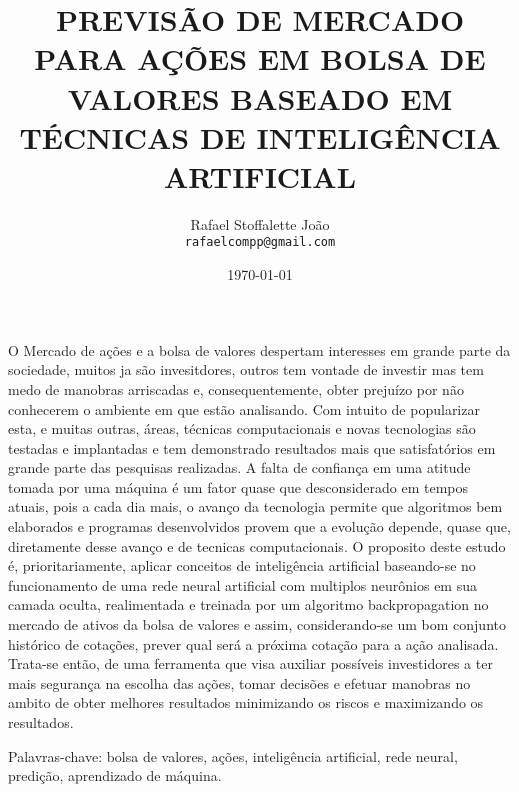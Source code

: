 \documentclass[brazil,twocolumn]{svjour3}
\author{Rafael Stoffalette João\\
\texttt{rafaelcompp@gmail.com}}
\title{ PREVISÃO DE MERCADO PARA AÇÕES EM BOLSA DE VALORES BASEADO EM TÉCNICAS DE INTELIGÊNCIA ARTIFICIAL
}
\date{\today}
\begin{document}
\maketitle

O Mercado de ações e a bolsa de valores despertam interesses em grande parte da sociedade, muitos ja são invesitdores, outros tem vontade de investir mas tem medo de manobras arriscadas e, consequentemente, obter prejuízo por não conhecerem o ambiente em que estão analisando. Com intuito de popularizar esta, e muitas outras, áreas, técnicas computacionais e novas tecnologias são testadas e implantadas e tem demonstrado resultados mais que satisfatórios em grande parte das pesquisas realizadas. 
A falta de confiança em uma atitude tomada por uma máquina é um fator quase que desconsiderado em tempos atuais, pois a cada dia mais, o avanço da tecnologia permite que algoritmos bem elaborados e programas desenvolvidos provem que a evolução depende, quase que, diretamente desse avanço  e de tecnicas computacionais.
O proposito deste estudo é, prioritariamente, aplicar conceitos de inteligência artificial baseando-se no funcionamento de uma rede neural artificial com multiplos neurônios em sua camada oculta, realimentada e treinada por um algoritmo backpropagation  no mercado de ativos da bolsa de valores e assim, considerando-se um bom conjunto histórico de cotações, prever qual será a próxima cotação para a ação analisada.
Trata-se então, de uma ferramenta que visa auxiliar possíveis investidores a ter mais segurança na escolha das ações, tomar decisões e efetuar manobras no ambito de obter melhores resultados minimizando os riscos e maximizando os resultados.

Palavras-chave: bolsa de valores, ações, inteligência artificial, rede neural, predição, aprendizado de máquina.
\end{document}
